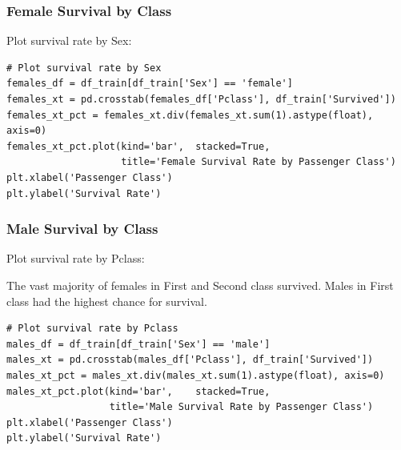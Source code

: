 \begin{frame}[fragile]\frametitle{Female Survival by Class}
Plot survival rate by Sex:
\begin{lstlisting}
# Plot survival rate by Sex
females_df = df_train[df_train['Sex'] == 'female']
females_xt = pd.crosstab(females_df['Pclass'], df_train['Survived'])
females_xt_pct = females_xt.div(females_xt.sum(1).astype(float), axis=0)
females_xt_pct.plot(kind='bar',  stacked=True, 
                    title='Female Survival Rate by Passenger Class')
plt.xlabel('Passenger Class')
plt.ylabel('Survival Rate')
\end{lstlisting}

\end{frame}

\begin{frame}[fragile]\frametitle{Male Survival by Class}
Plot survival rate by Pclass:

The vast majority of females in First and Second class survived. Males in First class had the highest chance for survival.

\begin{lstlisting}
# Plot survival rate by Pclass
males_df = df_train[df_train['Sex'] == 'male']
males_xt = pd.crosstab(males_df['Pclass'], df_train['Survived'])
males_xt_pct = males_xt.div(males_xt.sum(1).astype(float), axis=0)
males_xt_pct.plot(kind='bar',    stacked=True, 
                  title='Male Survival Rate by Passenger Class')
plt.xlabel('Passenger Class')
plt.ylabel('Survival Rate')                      
\end{lstlisting}

\end{frame}





